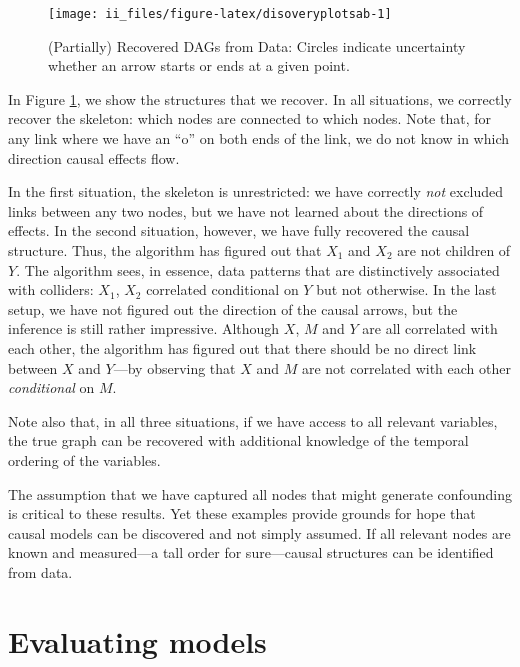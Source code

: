 \documentclass[
  12pt,
]{book}
\begin{document}
\begin{figure}

{\centering \texttt{[image: ii\_files/figure-latex/disoveryplotsab-1]} 

}

\caption{(Partially) Recovered DAGs from Data: Circles indicate uncertainty whether an arrow starts or ends at a given point.}\label{fig:disoveryplotsab}
\end{figure}

In Figure \ref{fig:disoveryplotsab}, we show the structures that we recover. In all situations, we correctly recover the skeleton: which nodes are connected to which nodes. Note that, for any link where we have an ``o'' on both ends of the link, we do not know in which direction causal effects flow.

In the first situation, the skeleton is unrestricted: we have correctly \emph{not} excluded links between any two nodes, but we have not learned about the directions of effects. In the second situation, however, we have fully recovered the causal structure. Thus, the algorithm has figured out that \(X_1\) and \(X_2\) are not children of \(Y\). The algorithm sees, in essence, data patterns that are distinctively associated with colliders: \(X_1\), \(X_2\) correlated conditional on \(Y\) but not otherwise. In the last setup, we have not figured out the direction of the causal arrows, but the inference is still rather impressive. Although \(X\), \(M\) and \(Y\) are all correlated with each other, the algorithm has figured out that there should be no direct link between \(X\) and \(Y\)---by observing that \(X\) and \(M\) are not correlated with each other \emph{conditional} on \(M\).

Note also that, in all three situations, if we have access to all relevant variables, the true graph can be recovered with additional knowledge of the temporal ordering of the variables.

The assumption that we have captured all nodes that might generate confounding is critical to these results. Yet these examples provide grounds for hope that causal models can be discovered and not simply assumed. If all relevant nodes are known and measured---a tall order for sure---causal structures can be identified from data.

\hypertarget{evaluation}{%
\chapter{Evaluating models}\label{evaluation}}
\end{document}
